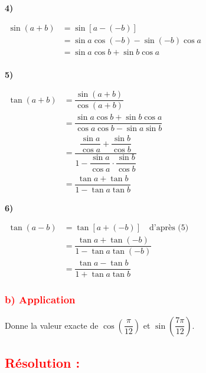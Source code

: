 \documentclass[a4paper,12pt]{article}
\begin{document}
\textbf{4) }

\(
\begin{aligned}
    \sin(a + b) & = \sin[a - (-b)]                      \\
                & = \sin a \cos (-b) - \sin (-b) \cos a \\
                & = \sin a \cos b + \sin b \cos a       \\
\end{aligned}
\)

\vspace{1em}
\textbf{5)}

\(
\begin{aligned}
    \tan(a + b) & = \dfrac{\sin(a + b)}{\cos(a + b)}                                                                                 \\
                & = \dfrac{\sin a \cos b + \sin b \cos a}{\cos a \cos b - \sin a \sin b}                                             \\
                & = \dfrac{\dfrac{\sin a}{\cos a} + \dfrac{\sin b}{\cos b}}{1 - \dfrac{\sin a}{\cos a} \cdot \dfrac{\sin b}{\cos b}} \\
                & = \dfrac{\tan a + \tan b}{1 - \tan a \tan b}
\end{aligned}
\)

\vspace{1em}
\textbf{6)}

\(
\begin{aligned}
    \tan(a - b) & = \tan[a + (-b)] \quad \text{d'après (5)}        \\
                & = \dfrac{\tan a + \tan(-b)}{1 - \tan a \tan(-b)} \\
                & = \dfrac{\tan a - \tan b}{1 + \tan a \tan b}
\end{aligned}
\)

\subsubsection*{\textcolor{red}{b) Application }}

Donne la valeur exacte de \( \cos\left(\dfrac{\pi}{12}\right) \) et \( \sin\left(\dfrac{7\pi}{12}\right) \).

\subsection*{\textcolor{red}{Résolution :}}
\end{document}
